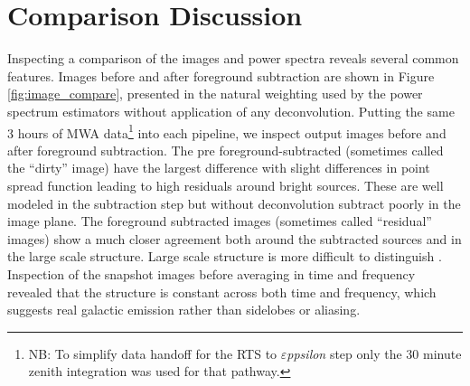 \documentclass[preprint2]{aastex}
\def\eppsilon{{\it $\varepsilon$ppsilon}}
\begin{document}
\section{Comparison Discussion}
\label{sec:results}
Inspecting a comparison of the images and power spectra reveals several common features. Images before and after foreground subtraction are shown in Figure \ref{fig:image_compare}, presented in the natural weighting used by the power spectrum estimators without application of any deconvolution.  Putting the same 3 hours of MWA data\footnote{NB: To simplify data handoff for the RTS to \eppsilon{} step only the 30 minute zenith integration was used for that pathway.} into each pipeline, we inspect output images before and after foreground subtraction. The pre foreground-subtracted (sometimes called the ``dirty'' image) have the largest difference with slight differences in point spread function leading to high residuals around bright sources. These are well modeled in the subtraction step but without deconvolution subtract poorly in the image plane.  The foreground subtracted images (sometimes called ``residual'' images) show a much closer agreement both around the subtracted sources and in the large scale structure. Large scale structure is more difficult to distinguish . Inspection of the snapshot images before averaging in time and frequency revealed that the structure is constant across both time and frequency, which suggests real galactic emission rather than sidelobes or aliasing.  



\end{document}
